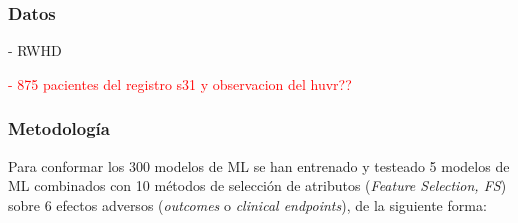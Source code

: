 \subsubsection{Datos}

- RWHD

\textcolor{red}{- 875 pacientes del registro s31 y observacion del huvr??}

\subsubsection{Metodología}

Para conformar los 300 modelos de ML se han entrenado y testeado 5 modelos de ML combinados con 10 métodos de selección de atributos (\textit{Feature Selection, FS}) sobre 6 efectos adversos (\textit{outcomes} o \textit{clinical endpoints}), de la siguiente forma: 

